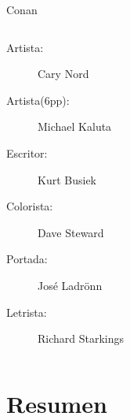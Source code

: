\begin{frame}{Conan}
\begin{columns}
\begin{itemize}
			\begin{description}
				\item[Artista:] Cary Nord
				\item[Artista(6pp):] Michael Kaluta
				\item[Escritor:] Kurt Busiek
				\item[Colorista:] Dave Steward
				\item[Portada:] José Ladrönn
				\item[Letrista:] Richard Starkings
			\end{description}
		\end{itemize}
	\end{columns}
\end{frame}
\note[itemize]{
	\item
}



\section{Resumen}
\note[itemize]{
	\item
}

